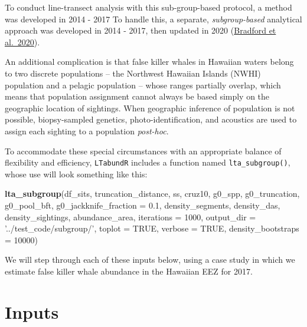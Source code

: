 \documentclass[
]{book}
\newenvironment{Shaded}{\begin{snugshade}}{\end{snugshade}}
\newcommand{\DataTypeTok}[1]{\textcolor[rgb]{0.13,0.29,0.53}{#1}}
\newcommand{\DecValTok}[1]{\textcolor[rgb]{0.00,0.00,0.81}{#1}}
\newcommand{\FloatTok}[1]{\textcolor[rgb]{0.00,0.00,0.81}{#1}}
\newcommand{\KeywordTok}[1]{\textcolor[rgb]{0.13,0.29,0.53}{\textbf{#1}}}
\newcommand{\NormalTok}[1]{#1}
\newcommand{\OtherTok}[1]{\textcolor[rgb]{0.56,0.35,0.01}{#1}}
\newcommand{\StringTok}[1]{\textcolor[rgb]{0.31,0.60,0.02}{#1}}
\begin{document}
To conduct line-transect analysis with this sub-group-based protocol, a method was developed in 2014 - 2017
To handle this, a separate, \emph{subgroup-based} analytical approach was developed in 2014 - 2017, then updated in 2020 (\href{https://www.fisheries.noaa.gov/inport/item/59592}{Bradford et al.~2020}).

An additional complication is that false killer whales in Hawaiian waters belong to two discrete populations -- the Northwest Hawaiian Islands (NWHI) population and a pelagic population -- whose ranges partially overlap, which means that population assignment cannot always be based simply on the geographic location of sightings. When geographic inference of population is not possible, biopsy-sampled genetics, photo-identification, and acoustics are used to assign each sighting to a population \emph{post-hoc}.

To accommodate these special circumstances with an appropriate balance of flexibility and efficiency, \texttt{LTabundR} includes a function named \texttt{lta\_subgroup()}, whose use will look something like this:

\begin{Shaded}
\begin{Highlighting}[]
\KeywordTok{lta_subgroup}\NormalTok{(df_sits,}
\NormalTok{             truncation_distance,}
\NormalTok{             ss,}
\NormalTok{             cruz10,}
\NormalTok{             g0_spp,}
\NormalTok{             g0_truncation,}
\NormalTok{             g0_pool_bft,}
             \DataTypeTok{g0_jackknife_fraction =} \FloatTok{0.1}\NormalTok{,}
\NormalTok{             density_segments,}
\NormalTok{             density_das,}
\NormalTok{             density_sightings,}
\NormalTok{             abundance_area,}
             \DataTypeTok{iterations =} \DecValTok{1000}\NormalTok{,}
             \DataTypeTok{output_dir =} \StringTok{'../test_code/subgroup/'}\NormalTok{,}
             \DataTypeTok{toplot =} \OtherTok{TRUE}\NormalTok{,}
             \DataTypeTok{verbose =} \OtherTok{TRUE}\NormalTok{,}
             \DataTypeTok{density_bootstraps =} \DecValTok{10000}\NormalTok{)}
\end{Highlighting}
\end{Shaded}

We will step through each of these inputs below, using a case study in which we estimate false killer whale abundance in the Hawaiian EEZ for 2017.

\hypertarget{inputs-1}{%
\section*{Inputs}\label{inputs-1}}
\end{document}
